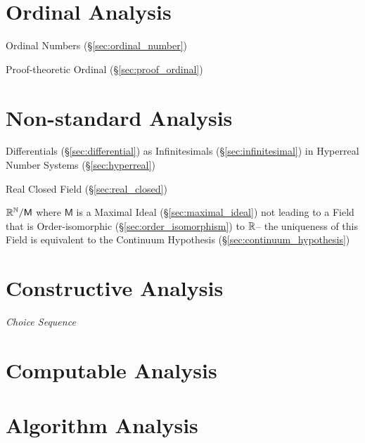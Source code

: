 \section{Ordinal Analysis}\label{sec:ordinal_analysis}

Ordinal Numbers (\S\ref{sec:ordinal_number})

Proof-theoretic Ordinal (\S\ref{sec:proof_ordinal})



\section{Non-standard Analysis}\label{sec:nonstandard_analysis}

Differentials (\S\ref{sec:differential}) as Infinitesimals
(\S\ref{sec:infinitesimal}) in Hyperreal Number Systems (\S\ref{sec:hyperreal})

Real Closed Field (\S\ref{sec:real_closed})

$\mathbb{R}^{\mathbb{N}} / \mathsf{M}$ where $\mathsf{M}$ is a Maximal Ideal
(\S\ref{sec:maximal_ideal}) not leading to a Field that is
Order-isomorphic (\S\ref{sec:order_isomorphism}) to $\mathbb{R}$-- the
uniqueness of this Field is equivalent to the Continuum Hypothesis
(\S\ref{sec:continuum_hypothesis})



\section{Constructive Analysis}\label{sec:constructive_analysis}

\emph{Choice Sequence}



\section{Computable Analysis}\label{sec:computable_analysis}

\section{Algorithm Analysis}\label{sec:algorithm_analysis}

